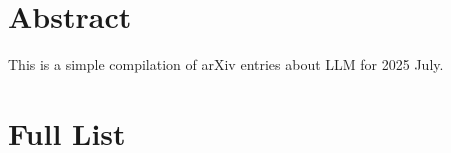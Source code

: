 

\section*{Abstract}
This is a simple compilation of arXiv entries about LLM for 2025 July.



\section*{Full List}
\newcommand{\arxivdigestentry}[2]{
    \noindent\parbox{\linewidth}{%
        {\small\sffamily\href{https://arxiv.org/abs/#1}{#1}}\\#2%
    }\par\vskip 7pt%
}



